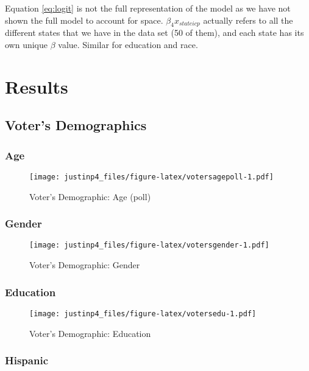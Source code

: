 \documentclass[
]{article}
\begin{document}
Equation \eqref{eq:logit} is not the full representation of the model as we have not shown the full model to account for space. \(\beta_{4}x_{stateicp}\) actually refers to all the different states that we have in the data set (50 of them), and each state has its own unique \(\beta\) value. Similar for education and race.

\hypertarget{results}{%
\section{Results}\label{results}}

\hypertarget{voters-demographics}{%
\subsection{Voter's Demographics}\label{voters-demographics}}

\hypertarget{age}{%
\subsubsection{Age}\label{age}}

\begin{figure}
\centering
\texttt{[image: justinp4\_files/figure-latex/votersagepoll-1.pdf]}
\caption{\label{fig:votersagepoll}Voter's Demographic: Age (poll)}
\end{figure}

\hypertarget{gender}{%
\subsubsection{Gender}\label{gender}}

\begin{figure}
\centering
\texttt{[image: justinp4\_files/figure-latex/votersgender-1.pdf]}
\caption{\label{fig:votersgender}Voter's Demographic: Gender}
\end{figure}

\hypertarget{education}{%
\subsubsection{Education}\label{education}}

\begin{figure}
\centering
\texttt{[image: justinp4\_files/figure-latex/votersedu-1.pdf]}
\caption{\label{fig:votersedu}Voter's Demographic: Education}
\end{figure}

\hypertarget{hispanic}{%
\subsubsection{Hispanic}\label{hispanic}}
\end{document}
